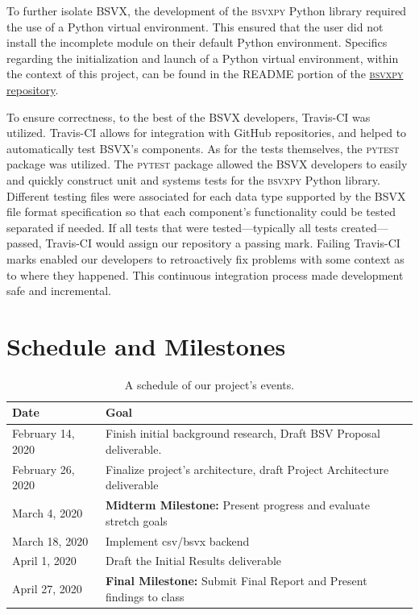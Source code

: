 \documentclass[10pt]{article}
\begin{document}
\indent{}
To further isolate BSVX, the development of the \textsc{bsvxpy} Python library required the use of a Python virtual environment.
This ensured that the user did not install the incomplete module on their default Python environment.
Specifics regarding the initialization and launch of a Python virtual environment, within the context of this project, can be found in the README portion of the \href{https://github.com/bsvx/bsvxpy}{\textsc{bsvxpy} repository}.

\indent{}
To ensure correctness, to the best of the BSVX developers, Travis-CI was utilized.
Travis-CI allows for integration with GitHub repositories, and helped to automatically test BSVX's components.
As for the tests themselves, the \textsc{pytest} package was utilized.
The \textsc{pytest} package allowed the BSVX developers to easily and quickly construct unit and systems tests for the \textsc{bsvxpy} Python library.
Different testing files were associated for each data type supported by the BSVX file format specification so that each component's functionality could be tested separated if needed.
If all tests that were tested---typically all tests created---passed, Travis-CI would assign our repository a passing mark.
Failing Travis-CI marks enabled our developers to retroactively fix problems with some context as to where they happened.
This continuous integration process made development safe and incremental.

\section*{Schedule and Milestones}

\begin{table}[H]
\centering
\begin{tabular}{|p{80pt}|p{375pt}|}
\hline
\textbf{Date} & \textbf{Goal} \\ \hline
February 14, 2020 & Finish initial background research, Draft BSV Proposal deliverable. \\ \hline
February 26, 2020 & Finalize project's architecture, draft Project Architecture deliverable\\ \hline
March 4, 2020 & \textbf{Midterm Milestone:} Present progress and evaluate stretch goals \\ \hline
March 18, 2020 & Implement csv/bsvx backend\\ \hline
April 1, 2020 & Draft the Initial Results deliverable \\ \hline
April 27, 2020& \textbf{Final Milestone:} Submit Final Report and Present findings to class \\ \hline
\end{tabular}
\caption{A schedule of our project's events.}
\label{tab:approach_schedule}
\end{table}
\end{document}
